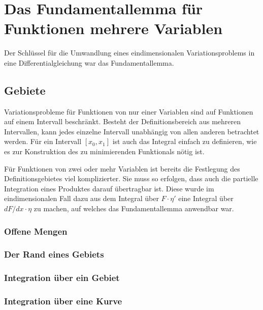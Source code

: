 %
%
%
\section{Das Fundamentallemma für Funktionen mehrere Variablen
\label{buch:felder:section:fundamentallemma}}
Der Schlüssel für die Umwandlung eines eindimensionalen Variationsproblems
in eine Differentialgleichung war das Fundamentallemma.

%
%
\subsection{Gebiete}
Variationsprobleme für Funktionen von nur einer Variablen sind auf 
Funktionen auf einem Intervall beschränkt.
Besteht der Definitionsbereich aus mehreren Intervallen, kann jedes
einzelne Intervall unabhängig von allen anderen betrachtet werden.
Für ein Intervall $[x_0,x_1]$ ist auch das Integral einfach zu definieren,
wie es zur Konstruktion des zu minimierenden Funktionals nötig ist.

Für Funktionen von zwei oder mehr Variablen ist bereits die
Festlegung des Definitionsgebietes viel komplizierter.
Sie muss so erfolgen, dass auch die partielle Integration eines
Produktes darauf übertragbar ist.
Diese wurde im eindimensionalen Fall dazu aus dem Integral
über $F\cdot\eta'$ eine Integral über $dF/dx\cdot \eta$ zu
machen, auf welches das Fundamentallemma anwendbar war.

%
%
\subsubsection{Offene Mengen}

%
%
\subsubsection{Der Rand eines Gebiets}

%
%
\subsubsection{Integration über ein Gebiet}

%
%
\subsubsection{Integration über eine Kurve}

